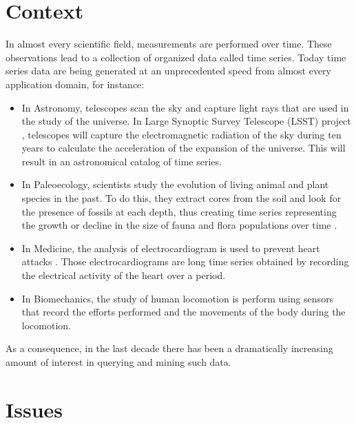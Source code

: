 
\section*{Context}

In almost every scientific field, measurements are performed over time. These observations lead to a collection
of organized data called time series. Today time series data are being generated at an unprecedented
speed from almost every application domain, for instance: 

\begin{itemize}
\item In Astronomy, telescopes scan the sky and capture light rays that are used in the study of the universe. In Large Synoptic Survey Telescope (LSST) project \cite{lsst}, telescopes will capture the electromagnetic radiation of the sky during ten years to calculate the acceleration of the expansion of the universe. This will result in an astronomical catalog of time series.
\item In Paleoecology, scientists study the evolution of living animal and plant species in the past. To do this, they extract cores from the soil and look for the presence of fossils at each depth, thus creating time series representing the growth or decline in the size of fauna and flora populations over time \cite{lonlacfouille}. 
\item In Medicine, the analysis of electrocardiogram is used to prevent heart attacks \cite{ding2011key}. Those electrocardiograms are long time series obtained by recording the electrical activity of the heart over a period.  
\item In Biomechanics, the study of human locomotion is perform using sensors that record the efforts performed and the movements of the body during the locomotion.
\end{itemize}

As a consequence, in the last decade there has been a dramatically increasing amount of interest in querying and mining such data.

\section*{Issues}



